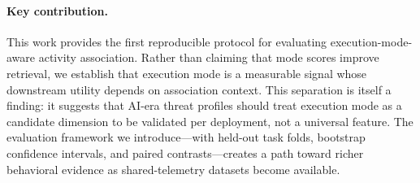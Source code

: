 \paragraph{Key contribution.} This work provides the first reproducible protocol for evaluating execution-mode-aware activity association. Rather than claiming that mode scores improve retrieval, we establish that execution mode is a measurable signal whose downstream utility depends on association context. This separation is itself a finding: it suggests that AI-era threat profiles should treat execution mode as a candidate dimension to be validated per deployment, not a universal feature. The evaluation framework we introduce---with held-out task folds, bootstrap confidence intervals, and paired contrasts---creates a path toward richer behavioral evidence as shared-telemetry datasets become available.
